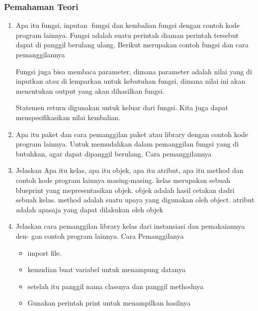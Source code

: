 \subsubsection{Pemahaman Teori}
\begin{enumerate}
    \item Apa itu fungsi, inputan fungsi dan kembalian fungsi dengan contoh kode program
    lainnya.
    Fungsi adalah suatu perintah diaman perintah tersebut dapat di panggil berulang ulang.
    Berikut merupakan contoh fungsi dan cara pemanggilannya
    

    Fungsi juga bisa membaca parameter, dimana parameter adalah nilai yang di inputkan atau di lemparkan untuk kebutuhan fungsi, dimana nilai ini akan menentukan output yang akan dihasilkan fungsi.
    

    Statemen return digunakan untuk keluar dari fungsi. Kita juga dapat menspesifikasikan nilai kembalian.
    

    \item Apa itu paket dan cara pemanggilan paket atau library dengan contoh kode
    program lainnya.
    Untuk memudahkan dalam pemanggilan fungsi yang di butuhkan, agar dapat dipanggil berulang.
    Cara pemanggilannya
    

    \item Jelaskan Apa itu kelas, apa itu objek, apa itu atribut, apa itu method dan
    contoh kode program lainnya masing-masing.
    kelas merupakan sebuah blueprint yang mepresentasikan objek.
    objek adalah hasil cetakan dadri sebuah kelas.
    method adalah suatu upaya yang digunakan oleh object.
    atribut adalah apasaja yang dapat dilakukan oleh objek
    

    \item Jelaskan cara pemanggilan library kelas dari instansiasi dan pemakaiannya den-
    gan contoh program lainnya.
    Cara Pemanggilanya 
    \begin{itemize}
        \item import file.
        \item kemudian buat variabel untuk menampung datanya
        \item setelah itu panggil nama classnya dan panggil methodnya
        \item Gunakan perintah print untuk menampilkan hasilnya


\end{itemize}
\end{enumerate}
